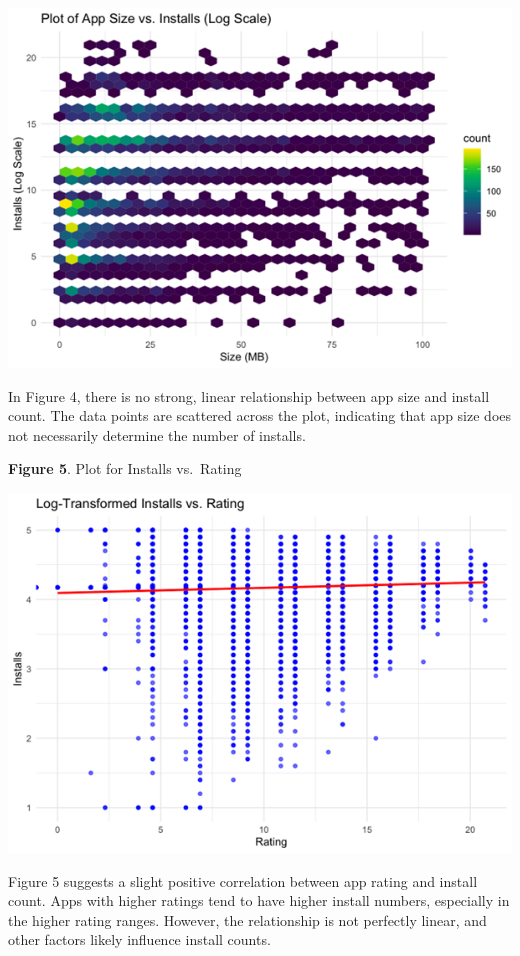 \documentclass[
]{article}
\begin{document}
\includegraphics{installs_vs_size.png}

In Figure 4, there is no strong, linear relationship between app size
and install count. The data points are scattered across the plot,
indicating that app size does not necessarily determine the number of
installs.

\textbf{Figure 5}. Plot for Installs vs.~Rating

\includegraphics{installs_vs_rating.png}

Figure 5 suggests a slight positive correlation between app rating and
install count. Apps with higher ratings tend to have higher install
numbers, especially in the higher rating ranges. However, the
relationship is not perfectly linear, and other factors likely influence
install counts.
\end{document}
